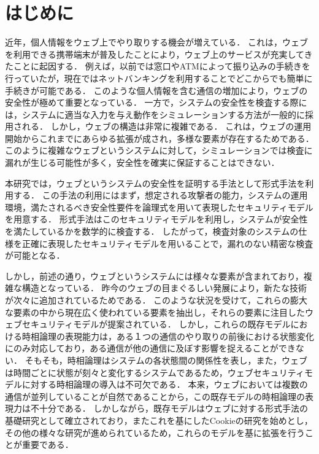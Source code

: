\documentclass[12pt,a4paper]{jbook}
\begin{document}
\newpage

\chapter{はじめに}
\label{sec:introduction}
近年，個人情報をウェブ上でやり取りする機会が増えている．
これは，ウェブを利用できる携帯端末が普及したことにより，ウェブ上のサービスが充実してきたことに起因する．
例えば，以前では窓口やATMによって振り込みの手続きを行っていたが，現在ではネットバンキングを利用することでどこからでも簡単に手続きが可能である．
このような個人情報を含む通信の増加により，ウェブの安全性が極めて重要となっている．
一方で，システムの安全性を検査する際には，システムに適当な入力を与え動作をシミュレーションする方法が一般的に採用される．
しかし，ウェブの構造は非常に複雑である．
これは，ウェブの運用開始からこれまでにあらゆる拡張が成され，多様な要素が存在するためである．
このように複雑なウェブというシステムに対して，シミュレーションでは検査に漏れが生じる可能性が多く，安全性を確実に保証することはできない．

本研究では，ウェブというシステムの安全性を証明する手法として形式手法を利用する．
この手法の利用にはまず，想定される攻撃者の能力，システムの運用環境，満たされるべき安全性要件を論理式を用いて表現したセキュリティモデルを用意する．
形式手法はこのセキュリティモデルを利用し，システムが安全性を満たしているかを数学的に検査する．
したがって，検査対象のシステムの仕様を正確に表現したセキュリティモデルを用いることで，漏れのない精密な検査が可能となる．

しかし，前述の通り，ウェブというシステムには様々な要素が含まれており，複雑な構造となっている．
昨今のウェブの目まぐるしい発展により，新たな技術が次々に追加されているためである．
このような状況を受けて，これらの膨大な要素の中から現在広く使われている要素を抽出し，それらの要素に注目したウェブセキュリティモデルが提案されている\cite{based-model,cookie-model}．
しかし，これらの既存モデルにおける時相論理の表現能力は，ある１つの通信のやり取りの前後における状態変化にのみ対応しており，ある通信が他の通信に及ぼす影響を捉えることができない．
そもそも，時相論理はシステムの各状態間の関係性を表し，また，ウェブは時間ごとに状態が刻々と変化するシステムであるため，ウェブセキュリティモデルに対する時相論理の導入は不可欠である．
本来，ウェブにおいては複数の通信が並列していることが自然であることから，この既存モデルの時相論理の表現力は不十分である．
しかしながら，既存モデル\cite{based-model}はウェブに対する形式手法の基礎研究として確立されており，またこれを基にしたCookieの研究\cite{cookie-model}を始めとし，その他の様々な研究\cite{chaitanya2017formal, bagheri2016practical, chen2015aspire, nelson2013aluminum, somorovsky2011all}が進められているため，これらのモデルを基に拡張を行うことが重要である．
\end{document}
